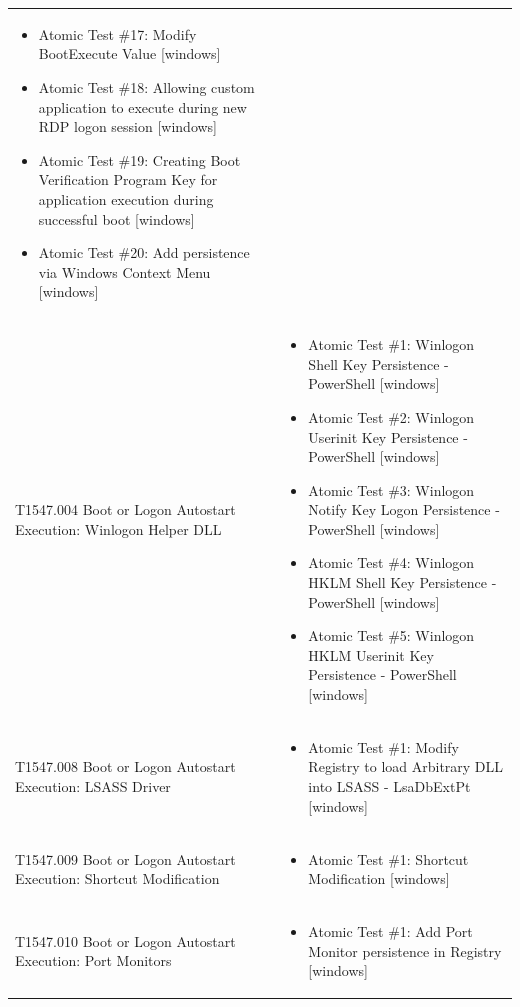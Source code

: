 \begin{longtable}{p{} p{}}
\begin{itemize}[leftmargin=*, nosep, topsep=0pt]
  \item Atomic Test \#17: Modify BootExecute Value [windows]
  \item Atomic Test \#18: Allowing custom application to execute during new RDP logon session [windows]
  \item Atomic Test \#19: Creating Boot Verification Program Key for application execution during successful boot [windows]
  \item Atomic Test \#20: Add persistence via Windows Context Menu [windows]
\end{itemize} \\ [1.5ex]
T1547.004 Boot or Logon Autostart Execution: Winlogon Helper DLL & \begin{itemize}[leftmargin=*, nosep, topsep=0pt]
  \item Atomic Test \#1: Winlogon Shell Key Persistence - PowerShell [windows]
  \item Atomic Test \#2: Winlogon Userinit Key Persistence - PowerShell [windows]
  \item Atomic Test \#3: Winlogon Notify Key Logon Persistence - PowerShell [windows]
  \item Atomic Test \#4: Winlogon HKLM Shell Key Persistence - PowerShell [windows]
  \item Atomic Test \#5: Winlogon HKLM Userinit Key Persistence - PowerShell [windows]
\end{itemize} \\ [1.5ex]
T1547.008 Boot or Logon Autostart Execution: LSASS Driver & \begin{itemize}[leftmargin=*, nosep, topsep=0pt]
  \item Atomic Test \#1: Modify Registry to load Arbitrary DLL into LSASS - LsaDbExtPt [windows]
\end{itemize} \\ [1.5ex]
T1547.009 Boot or Logon Autostart Execution: Shortcut Modification & \begin{itemize}[leftmargin=*, nosep, topsep=0pt]
  \item Atomic Test \#1: Shortcut Modification [windows]
\end{itemize} \\ [1.5ex]
T1547.010 Boot or Logon Autostart Execution: Port Monitors & \begin{itemize}[leftmargin=*, nosep, topsep=0pt]
  \item Atomic Test \#1: Add Port Monitor persistence in Registry [windows]
\end{itemize} \\ [1.5ex]

\end{longtable}
